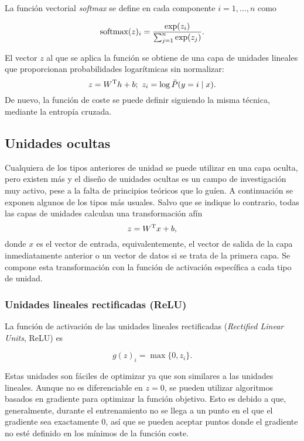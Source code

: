 La función vectorial \emph{softmax} se define en cada componente
\(i=1,\dots,n\) como

\begin{equation}\label{eq:softmax}
  \mathrm{softmax}(z)_i = \frac{\exp(z_i)}{\sum_{j=1}^{n}\exp(z_j)}.
\end{equation}

El vector \(z\) al que se aplica la función se obtiene de una capa de
unidades lineales que proporcionan probabilidades logarítmicas sin
normalizar: \[z=W^{\mathrm{T}}h+b;\ z_{i}=\log\tilde P(y=i\mid x).\] De nuevo, la
función de coste se puede definir siguiendo la misma técnica, mediante
la entropía cruzada.

\subsection{Unidades ocultas}\label{unidades-ocultas}

Cualquiera de los tipos anteriores de unidad se puede utilizar en una
capa oculta, pero existen más y el diseño de unidades ocultas es un
campo de investigación muy activo, pese a la falta de principios
teóricos que lo guíen. A continuación se exponen algunos de los tipos
más usuales. Salvo que se indique lo contrario, todas las capas de
unidades calculan una transformación afín \[z=W^{\mathrm{T}}x+b,\] donde \(x\) es
el vector de entrada, equivalentemente, el vector de salida de la capa
inmediatamente anterior o un vector de datos si se trata de la primera
capa. Se compone esta transformación con la función de activación
específica a cada tipo de unidad.

\subsubsection{Unidades lineales rectificadas
(ReLU)}\label{unidades-lineales-rectificadas-relu}

La función de activación de las unidades lineales rectificadas
(\emph{Rectified Linear Units}, ReLU) es

\begin{equation}
g(z)_i=\max\{0,z_i\}.
\end{equation}

Estas unidades son fáciles de optimizar ya que son similares a las
unidades lineales. Aunque no es diferenciable en \(z=0\), se pueden
utilizar algoritmos basados en gradiente para optimizar la función
objetivo. Esto es debido a que, generalmente, durante el entrenamiento
no se llega a un punto en el que el gradiente sea exactamente 0, así que
se pueden aceptar puntos donde el gradiente no esté definido en los
mínimos de la función coste.


